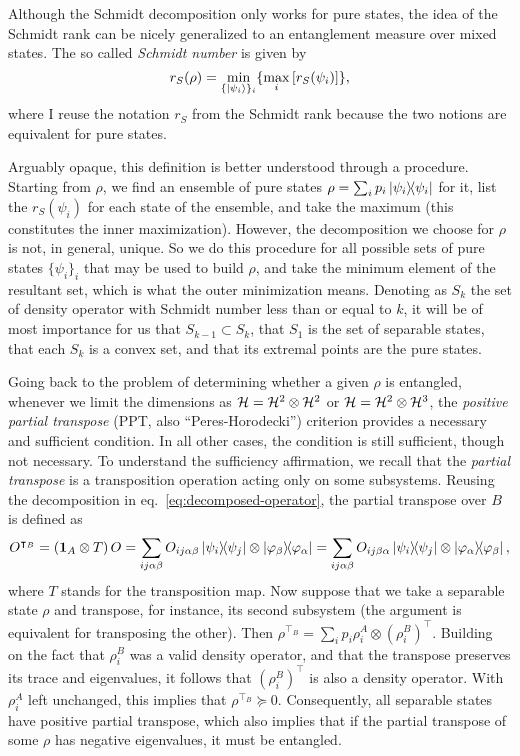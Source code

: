 		Although the Schmidt decomposition only works for pure states, the idea of the Schmidt rank can be nicely generalized to an entanglement measure over mixed states. The so called \emph{Schmidt number} \cite{terhal_2000_schmidtnumber} is given by 
		\begin{equation}
			r_S(\rho) = \min_{\{ \ket{\psi_i} \}_i} \{ \max_i \left[ r_S(\psi_i ) \right] \} ,
			\label{eq:schmidt-number}
		\end{equation}
		where I reuse the notation $r_S$ from the Schmidt rank because the two notions are equivalent for pure states.
	
		Arguably opaque, this definition is better understood through a procedure. Starting from $\rho$, we find an ensemble of pure states $\rho = \sum_i p_i \ketbra{\psi_i}{\psi_i}$ for it, list the $r_S(\psi_i)$ for each state of the ensemble, and take the maximum (this constitutes the inner maximization). However,  the decomposition we choose for $\rho$ is not, in general, unique. So we do this procedure for all possible sets of pure states $\{ \psi_i \}_i$ that may be used to build $\rho$, and take the minimum element of the resultant set, which is what the outer minimization means. Denoting as $S_k$ the set of density operator with Schmidt number less than or equal to $k$, it will be of most importance for us that $S_{k-1} \subset S_k$, that $S_1$ is the set of separable states, that each $S_k$ is a convex set, and that its extremal points are the pure states.
	
		Going back to the problem of determining whether a given $\rho$ is entangled, whenever we limit the dimensions as $\mathcal{H} = \mathcal{H}^{2} \otimes \mathcal{H}^{2}$ or $\mathcal{H} = \mathcal{H}^{2} \otimes \mathcal{H}^{3}$, the \emph{positive partial transpose} (PPT, also ``Peres-Horodecki'') criterion provides a necessary and sufficient condition. In all other cases, the condition is still sufficient, though not necessary. To understand the sufficiency affirmation, we recall that the \emph{partial transpose} is a transposition operation acting only on some subsystems. Reusing the decomposition in eq.~\eqref{eq:decomposed-operator}, the partial transpose over $B$ is defined as
		$$
			O^{\intercal_B} = (\mathbf{1}_A \otimes T)\,O = \sum_{ij\alpha\beta} O_{ij\alpha\beta} \ketbra{\psi_i}{\psi_j} \otimes \ketbra{\varphi_\beta}{\varphi_\alpha} = \sum_{ij\alpha\beta} O_{ij\beta\alpha} \ketbra{\psi_i}{\psi_j} \otimes \ketbra{\varphi_\alpha}{\varphi_\beta} , 
		$$
		where $T$ stands for the transposition map. Now suppose that we take a separable state $\rho$ and transpose, for instance, its second subsystem (the argument is equivalent for transposing the other). Then $\rho^{\intercal_B} = \sum_i p_i \rho_i^A \otimes \left( \rho_i^B \right)^\intercal$. Building on the fact that $\rho_i^B$ was a valid density operator, and that the transpose preserves its trace and eigenvalues, it follows that $\left( \rho_i^B \right)^\intercal$ is also a density operator. With $\rho_i^A$ left unchanged, this implies that $\rho^{\intercal_B} \succeq 0$. Consequently, all separable states have positive partial transpose, which also implies that if the partial transpose of some $\rho$ has negative eigenvalues, it must be entangled.
	
